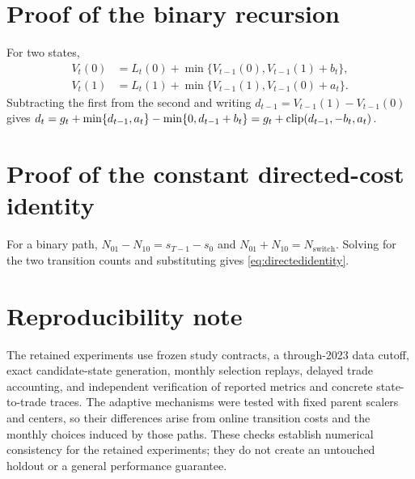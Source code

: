 \begin{appendices}

\section{Proof of the binary recursion}\label{app:binary}
For two states,
\begin{align}
V_t(0)&=L_t(0)+\min\{V_{t-1}(0),V_{t-1}(1)+b_t\},\\
V_t(1)&=L_t(1)+\min\{V_{t-1}(1),V_{t-1}(0)+a_t\}.
\end{align}
Subtracting the first from the second and writing $d_{t-1}=V_{t-1}(1)-V_{t-1}(0)$
gives $d_t=g_t+\min\{d_{t-1},a_t\}-\min\{0,d_{t-1}+b_t\}
=g_t+\operatorname{clip}(d_{t-1},-b_t,a_t)$.

\section{Proof of the constant directed-cost identity}\label{app:directed}
For a binary path, $N_{01}-N_{10}=s_{T-1}-s_0$ and
$N_{01}+N_{10}=N_{\mathrm{switch}}$. Solving for the two transition counts and
substituting gives \cref{eq:directedidentity}.

\section{Reproducibility note}\label{app:repro}
The retained experiments use frozen study contracts, a through-2023 data cutoff,
exact candidate-state generation, monthly selection replays, delayed trade
accounting, and independent verification of reported metrics and concrete
state-to-trade traces. The adaptive mechanisms were tested with fixed parent
scalers and centers, so their differences arise from online transition costs and
the monthly choices induced by those paths. These checks establish numerical
consistency for the retained experiments; they do not create an untouched holdout
or a general performance guarantee.

\end{appendices}


